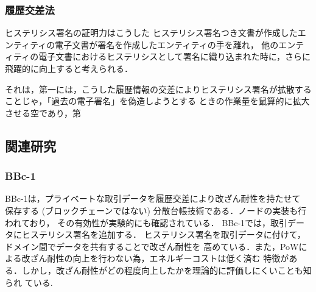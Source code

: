 \documentclass[a4paper,12pt]{jsarticle}
\begin{document}





      \subsubsection{履歴交差法}
ヒステリシス署名の証明力はこうした
ヒステリシス署名つき文書が作成したエンティティの電子文書が署名を作成したエンティティの手を離れ，
他のエンティティの電子文書におけるヒステリシスとして署名に織り込まれた時に，さらに飛躍的に向上すると考えられる．

それは，第一には，こうした履歴情報の交差によりヒステリシス署名が拡散することじゃ，「過去の電子署名」を偽造しようとする
ときの作業量を鼠算的に拡大させる空であり，第


\subsection{関連研究}
      \subsubsection{BBc-1}

BBc-1\cite{saito}は，プライベートな取引データを履歴交差により改ざん耐性を持たせて
保存する (ブロックチェーンではない) 分散台帳技術である．ノードの実装も行われており，
その有効性が実験的にも確認されている．
BBc-1では，取引データにヒステリシス署名を追加する．
ヒステリシス署名を取引データに付けて，ドメイン間でデータを共有することで改ざん耐性を
高めている．また，PoWによる改ざん耐性の向上を行わない為，エネルギーコストは低く済む
特徴がある．しかし，改ざん耐性がどの程度向上したかを理論的に評価しにくいことも知られ
ている. 
\end{document}
